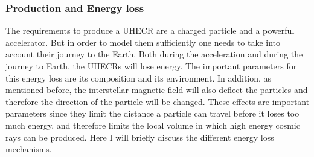 \subsubsection{Production and Energy loss}
The requirements to produce a UHECR are a charged particle and a powerful accelerator. But in order to
model them sufficiently one needs to take into account their journey to the Earth. Both during the acceleration and during the journey to Earth, the UHECRs will lose energy. 
The important parameters for this energy loss are its composition and its environment. In addition, as mentioned before, the interstellar magnetic field will also deflect the particles and therefore the direction of the particle will be changed. 
These effects are important parameters since they limit the 
distance a particle can travel before it loses too much energy, and therefore limits the local volume in which high energy cosmic rays can be produced. 
Here I will briefly discuss the different energy loss mechanisms.
